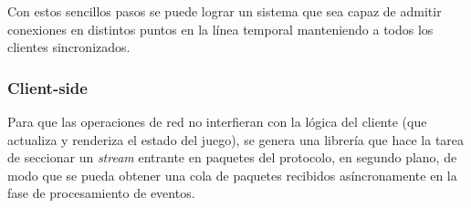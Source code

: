 
Con estos sencillos pasos se puede lograr un sistema que sea capaz de admitir conexiones en distintos puntos en la línea temporal manteniendo a todos los clientes sincronizados.

\subsubsection*{Client-side}

Para que las operaciones de red no interfieran con la lógica del cliente (que actualiza y renderiza el estado del juego), se genera una librería que hace la tarea de seccionar un \emph{stream} entrante en paquetes del protocolo, en segundo plano, de modo que se pueda obtener una cola de paquetes recibidos asíncronamente en la fase de procesamiento de eventos.
